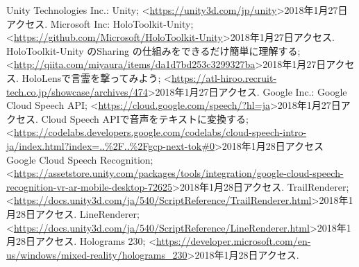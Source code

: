 \documentclass[11pt,a4j, titlepage]{jarticle} %
\begin{document}
\begin{thebibliography}{数字}
   Unity Technologies Inc.: Unity;  \textless\url{https://unity3d.com/jp/unity}\textgreater2018年1月27日アクセス.
   Microsoft Inc: HoloToolkit-Unity; \textless\url{https://github.com/Microsoft/HoloToolkit-Unity}\textgreater2018年1月27日アクセス.
   HoloToolkit-Unity のSharing の仕組みをできるだけ簡単に理解する; \textless\url{http://qiita.com/miyaura/items/da1d7bd253c3299327ba}\textgreater2018年1月27日アクセス.
   HoloLensで言霊を撃ってみよう;  \textless\url{https://atl-hiroo.recruit-tech.co.jp/showcase/archives/474}\textgreater2018年1月27日アクセス.
   Google Inc.: Google Cloud Speech API; \textless\url{https://cloud.google.com/speech/?hl=ja}\textgreater2018年1月27日アクセス.
   Cloud Speech APIで音声をテキストに変換する; \textless\url{https://codelabs.developers.google.com/codelabs/cloud-speech-intro-ja/index.html?index=..\%2F..\%2Fgcp-next-tok\#0}\textgreater2018年1月28日アクセス
   Google Cloud Speech Recognition;  \textless\url{https://assetstore.unity.com/packages/tools/integration/google-cloud-speech-recognition-vr-ar-mobile-desktop-72625}\textgreater2018年1月28日アクセス.
   TrailRenderer; \textless\url{https://docs.unity3d.com/ja/540/ScriptReference/TrailRenderer.html}\textgreater2018年1月28日アクセス.
   LineRenderer; \textless\url{https://docs.unity3d.com/ja/540/ScriptReference/LineRenderer.html}\textgreater2018年1月28日アクセス.
   Holograms 230; \textless\url{https://developer.microsoft.com/en-us/windows/mixed-reality/holograms_230}\textgreater2018年1月28日アクセス.
\end{thebibliography}
\end{document}
